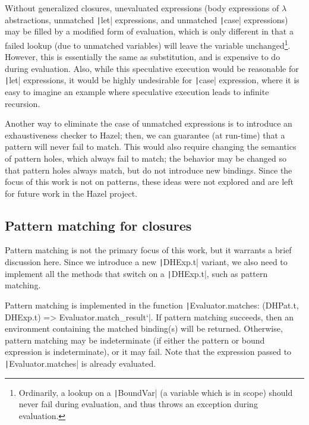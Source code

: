 Without generalized closures, unevaluated expressions (body expressions of $\lambda$ abstractions, unmatched \texttt|let| expressions, and unmatched \texttt|case| expressions) may be filled by a modified form of evaluation, which is only different in that a failed lookup (due to unmatched variables) will leave the variable unchanged\footnote{Ordinarily, a lookup on a \texttt|BoundVar| (a variable which is in scope) should never fail during evaluation, and thus throws an exception during evaluation.}. However, this is essentially the same as substitution, and is expensive to do during evaluation. Also, while this speculative execution would be reasonable for \texttt|let| expressions, it would be highly undesirable for \texttt|case| expression, where it is easy to imagine an example where speculative execution leads to infinite recursion.

Another way to eliminate the case of unmatched expressions is to introduce an exhaustiveness checker to Hazel; then, we can guarantee (at run-time) that a pattern will never fail to match. This would also require changing the semantics of pattern holes, which always fail to match; the behavior may be changed so that pattern holes always match, but do not introduce new bindings. Since the focus of this work is not on patterns, these ideas were not explored and are left for future work in the Hazel project.

\subsection{Pattern matching for closures}
\label{sec:generalized-closures-matching}

Pattern matching is not the primary focus of this work, but it warrants a brief discussion here. Since we introduce a new \texttt|DHExp.t| variant, we also need to implement all the methods that switch on a \texttt|DHExp.t|, such as pattern matching.

Pattern matching is implemented in the function \texttt|Evaluator.matches: (DHPat.t, DHExp.t) => Evaluator.match_result`|. If pattern matching succeeds, then an environment containing the matched binding(s) will be returned. Otherwise, pattern matching may be indeterminate (if either the pattern or bound expression is indeterminate), or it may fail. Note that the expression passed to \texttt|Evaluator.matches| is already evaluated.

